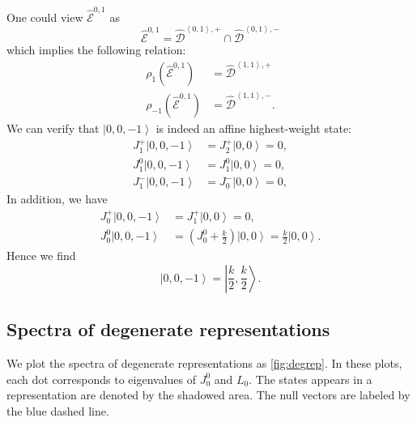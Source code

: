 \documentclass[10pt,a4paper]{article}
\numberwithin{equation}{section}
\newcommand{\ket}[1]{\left| #1 \right\rangle}
\newcommand{\vev}[1]{\left\langle #1 \right\rangle}
\begin{document}
One could view $\hat{\mathcal{E}}^{0,1}$ as
\begin{equation}
    \hat{\mathcal{E}}^{0,1} = \hat{\mathcal{D}}^{\vev{0,1},+} \cap \hat{\mathcal{D}}^{\vev{0,1},-}
\end{equation}
which implies the following relation: 
\begin{equation}
    \begin{aligned}
        \rho_{1} \left(\hat{\mathcal{E}}^{0,1}\right) &= \hat{\mathcal{D}}^{\vev{1,1},+}\\
        \rho_{-1} \left(\hat{\mathcal{E}}^{0,1}\right) &= \hat{\mathcal{D}}^{\vev{1,1},-}.
    \end{aligned}
\end{equation}
We can verify that $\ket{0,0,-1}$ is indeed an affine highest-weight state:
\begin{equation}
    \begin{aligned}
        J^{+}_{1} \ket{0,0,-1} &= J^{+}_{2} \ket{0,0} = 0, \\
        J^{0}_{1} \ket{0,0,-1} &= J^{0}_{1} \ket{0,0} = 0, \\
        J^{-}_{1} \ket{0,0,-1} &= J^{-}_{0} \ket{0,0} = 0, 
    \end{aligned}
\end{equation}
In addition, we have 
\begin{equation}
    \begin{aligned}
        J^{+}_{0} \ket{0,0,-1} &= J^{+}_{1} \ket{0,0} = 0,\\
        J^{0}_{0} \ket{0,0,-1} &= \left(J^{0}_{0} + \frac{k}{2} \right) \ket{0,0} = \frac{k}{2} \ket{0,0}.
    \end{aligned}
\end{equation}
Hence we find 
\begin{equation}
    \ket{0,0,-1} = \ket{\frac{k}{2}, \frac{k}{2}}.
\end{equation}

\subsection{Spectra of degenerate representations}
We plot the spectra of degenerate representations as \ref{fig:degrep}. In these plots, each dot corresponds to eigenvalues of $J^{0}_{0}$ and 
$L_{0}$. The states appears in a representation are denoted by the shadowed area. The null vectors are labeled by the blue dashed line. 
\end{document}
